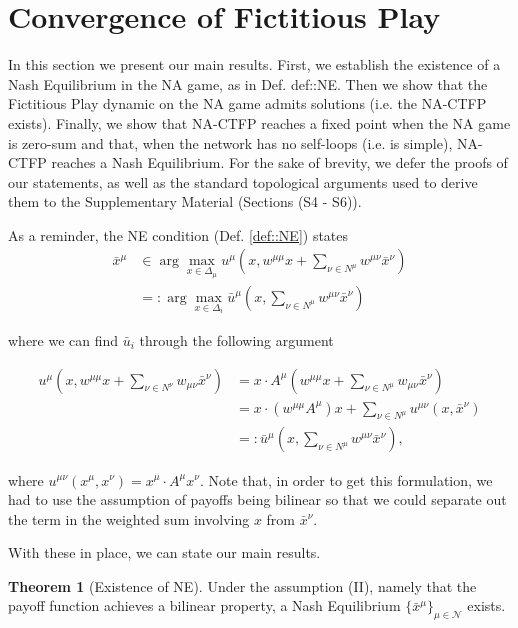 \documentclass{article}
\theoremstyle{definition}
\newtheorem{theorem}{Theorem}
\newcommand{\agentset}{\mathcal{N}}
\newcommand{\xmu}{x^{\mu}}
\newcommand{\NE}[1]{\bar{x}^{#1}}
\begin{document}
\section{Convergence of Fictitious Play}

  
  In this section we present our main results. First, we establish the existence of a Nash Equilibrium in the NA game, as in Def. \refname{def::NE}. Then we show that the Fictitious Play dynamic on the NA game admits solutions (i.e. the NA-CTFP exists). Finally, we show that NA-CTFP reaches a fixed point when the NA game is zero-sum and that, when the network has no self-loops (i.e. is simple), NA-CTFP reaches a Nash Equilibrium. For the sake of brevity, we defer the proofs of our statements, as well as the standard topological arguments used to derive them to the Supplementary Material (Sections (S4 - S6)).

  As a reminder, the NE condition (Def. \ref{def::NE}) states
%
  \begin{align}
    \NE{\mu} &\in \arg\max_{x \in \Delta_\mu} u^\mu(x, w^{\mu \mu}x + \sum_{\nu \in N^\mu} w^{\mu \nu} \NE{\nu}) \nonumber \\
    & =: \arg\max_{x \in \Delta_i} \bar{u}^\mu(x, \sum_{\nu \in N^\mu} w^{\mu \nu} \NE{\nu})
  \end{align}

  where we can find $\bar{u}_i$ through the following argument
  
  \begin{align}
    u^\mu(x, w^{\mu \mu} x + \sum_{\nu \in N^\nu} w_{\mu \nu} \NE{\nu}) & = x \cdot A^\mu (w^{\mu \mu} x + \sum_{\nu \in N^\mu} w_{\mu \nu} \NE{\nu}) \\
     & = x \cdot (w^{\mu \mu} A^\mu)  x + \sum_{\nu \in N^\mu} u^{\mu \nu}(x, \NE{\nu}) \\
     & =: \bar{u}^\mu(x, \sum_{\nu \in N^\mu} w^{\mu \nu} \NE{\nu}), \nonumber
  \end{align}
  
  where $u^{\mu \nu}(\xmu, x^\nu) = \xmu \cdot A^\mu x^\nu$. Note
  that, in order to get this formulation, we had to use the assumption
  of payoffs being bilinear so that we could separate out the term in
  the weighted sum involving $x$ from $\bar{x}^\nu$.

  With these in place, we can state our main results.
  
  \begin{theorem}[Existence of NE]
    Under the assumption (II), namely that the payoff function achieves a bilinear property, a
    Nash Equilibrium $\{\bar{x}^\mu\}_{\mu \in \agentset}$ exists.
  \end{theorem}
\end{document}

